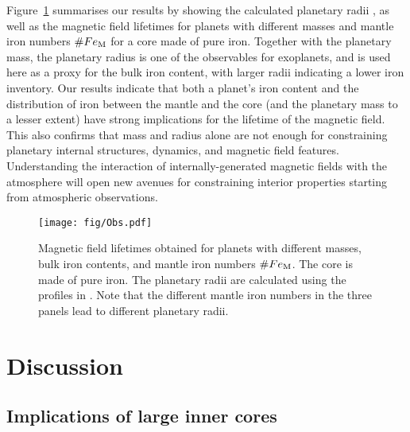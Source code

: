\documentclass[draft]{agujournal2019} %
\newcommand{\marine}[1]{\textcolor{greenblue}{\textit{(Marine: #1)}}}
\begin{document}
Figure~\ref{fig:massradius} summarises our results by showing the calculated planetary radii \cite{noacklasbleis_2020}, as well as the magnetic field lifetimes for planets with different masses and mantle iron numbers $\#Fe_{\rm M}$ for a core made of pure iron. Together with the planetary mass, the planetary radius is one of the observables for exoplanets, and is used here as a proxy for the bulk iron content, with larger radii indicating a lower iron inventory. Our results indicate that both a planet's iron content and the distribution of iron between the mantle and the core (and the planetary mass to a lesser extent) have strong implications for the lifetime of the magnetic field. This also confirms that mass and radius alone are not enough for constraining planetary internal structures, dynamics, and magnetic field features. Understanding the interaction of internally-generated magnetic fields with the atmosphere will open new avenues for constraining interior properties starting from atmospheric observations.

\begin{figure}
\texttt{[image: fig/Obs.pdf]}
\caption{Magnetic field lifetimes obtained for planets with different masses, bulk iron contents, and mantle iron numbers $\#Fe_{\rm M}$. The core is made of pure iron. The planetary radii are calculated using the profiles in . Note that the different mantle iron numbers in the three panels lead to different planetary radii.}
\label{fig:massradius}
\end{figure}

\section{Discussion}\label{sec:discussion}

\subsection{Implications of large inner cores}\label{sec:large_IC}

\end{document}
